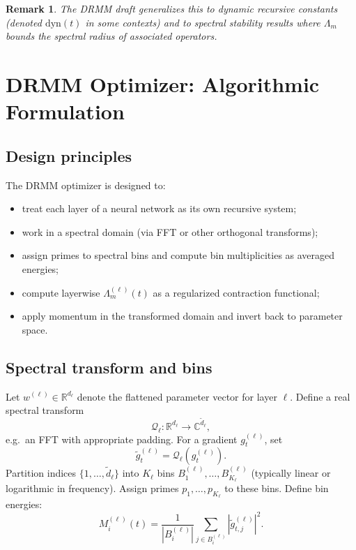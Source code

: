 \documentclass[11pt]{article}
\newtheorem{remark}{Remark}
\begin{document}
\begin{remark}
The DRMM draft generalizes this to dynamic recursive constants (denoted $\mathrm{dyn}(t)$ in some contexts) and to spectral stability results where $\Lambda_m$ bounds the spectral radius of associated operators.
\end{remark}

\section{DRMM Optimizer: Algorithmic Formulation}

\subsection{Design principles}

The DRMM optimizer is designed to:
\begin{itemize}[leftmargin=*]
  \item treat each layer of a neural network as its own recursive system;
  \item work in a spectral domain (via FFT or other orthogonal transforms);
  \item assign primes to spectral bins and compute bin multiplicities as averaged energies;
  \item compute layerwise $\Lambda_m^{(\ell)}(t)$ as a regularized contraction functional;
  \item apply momentum in the transformed domain and invert back to parameter space.
\end{itemize}

\subsection{Spectral transform and bins}

Let $w^{(\ell)} \in \mathbb{R}^{d_\ell}$ denote the flattened parameter vector for layer $\ell$. Define a real spectral transform
\[
\mathcal{Q}_\ell : \mathbb{R}^{d_\ell} \to \mathbb{C}^{\tilde d_\ell},
\]
e.g.\ an FFT with appropriate padding. For a gradient $g_t^{(\ell)}$, set
\[
\tilde g_t^{(\ell)} = \mathcal{Q}_\ell(g_t^{(\ell)}).
\]
Partition indices $\{1,\dots,\tilde d_\ell\}$ into $K_\ell$ bins $B_1^{(\ell)},\dots,B_{K_\ell}^{(\ell)}$ (typically linear or logarithmic in frequency). Assign primes $p_1,\dots,p_{K_\ell}$ to these bins. Define bin energies:
\begin{equation}
M_i^{(\ell)}(t)
=
\frac{1}{|B_i^{(\ell)}|}
\sum_{j \in B_i^{(\ell)}} |\tilde g_{t,j}^{(\ell)}|^2.
\end{equation}
\end{document}
